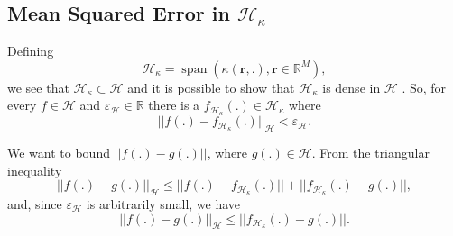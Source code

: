 \subsection{Mean Squared Error in $\mathcal{H}_{\kappa}$}

Defining 
\begin{equation}
    \mathcal{H}_{\kappa} = \operatorname{span}(\kappa(\mathbf{r},.), \mathbf{r} \in \mathbb{R}^M),
\end{equation}
we see that $\mathcal{H}_{\kappa} \subset \mathcal{H}$ and it is possible to show that $\mathcal{H}_{\kappa}$ is dense in $\mathcal{H}$ \cite{aronszajn_theory_1950}. So, for every $f \in \mathcal{H}$ and $\varepsilon_\mathcal{H} \in \mathbb{R}$ there is a $f_{\mathcal{H}_{\kappa}}(.) \in \mathcal{H}_{\kappa} $ where
\begin{equation}
||f(.) - f_{\mathcal{H}_{\kappa}}(.)||_\mathcal{H} < \varepsilon_\mathcal{H}.    
\end{equation}

We want to bound $||f(.) - g(.)||$, where $ g(.) \in \mathcal{H}$. From the triangular inequality
\begin{equation}
    ||f(.) - g(.)||_\mathcal{H} \leq ||f(.) - f_{\mathcal{H}_\kappa}(.)|| + ||f_{\mathcal{H}_\kappa}(.) - g(.)||,
\end{equation}
and, since $\varepsilon_\mathcal{H}$ is arbitrarily small, we have
\begin{equation}
    ||f(.) - g(.)||_\mathcal{H} \leq ||f_{\mathcal{H}_\kappa}(.) - g(.)||.
\end{equation}

